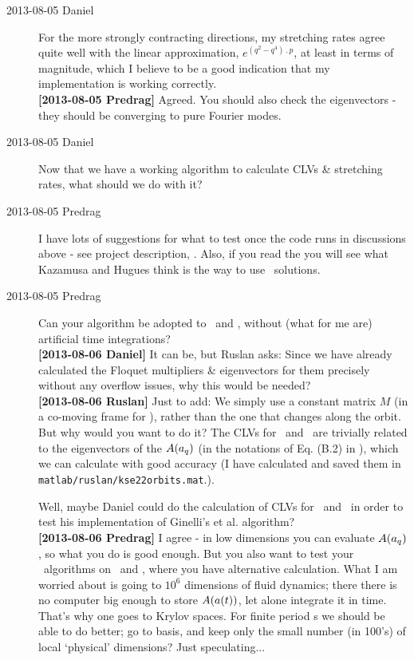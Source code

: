 \begin{description}
\item[2013-08-05 Daniel]
For the more strongly contracting directions, my stretching rates agree
quite well with the linear approximation, $e^{(q^2-q^4)\period{p}}$, at least
in terms of magnitude, which I believe to be a good indication that my
implementation is working correctly.
\\
{\bf [2013-08-05 Predrag]} Agreed. You should also check the eigenvectors - they
should be converging to pure Fourier modes.

\item[2013-08-05 Daniel]
Now that we have a working algorithm to calculate CLVs \& stretching
rates, what should we do with it?

\item[2013-08-05 Predrag] I have lots of suggestions for what to test
once the code runs in discussions above - see project description,
. Also, if you read the  you will
see what Kazamusa and Hugues think is the way to use \po\ solutions.

\item[2013-08-05 Predrag] Can your algorithm be adopted to
\eqva\ and \reqva, without (what for me are) artificial time integrations?
\\
{\bf [2013-08-06 Daniel]} It can be, but Ruslan asks: Since we have
already calculated the Floquet multipliers \& eigenvectors for them
precisely without any overflow issues, why this would be needed?
\\
{\bf [2013-08-06 Ruslan]} Just to add: We simply use a constant matrix
$M$ (in a co-moving frame for \reqva), rather than the one that changes
along the orbit.  But why would you want to do it?  The CLVs for \eqva\
and \reqva\ are trivially related to the eigenvectors of the {\stabmat}
$A(a_q)$ (in the notations of Eq. (B.2) in \refref{SCD07}), which
we can calculate with good accuracy (I have calculated and saved them
in\\ \texttt{matlab/ruslan/kse22orbits.mat}.).

Well, maybe Daniel
could do the calculation of CLVs for \eqva\ and \reqva\ in order to test
his implementation of Ginelli's et al. algorithm?
\\
{\bf [2013-08-06 Predrag]} I agree - in low dimensions you can evaluate
{\stabmat} $A(a_q)$, so what you do is good enough. But you also want to
test your \po\ algorithms on \eqva\ and \reqva, where you have alternative
calculation. What I am worried about is going to $10^6$ dimensions of
fluid dynamics; there there is no computer big enough to store
$A(a(t))$, let alone integrate it in time. That's why one goes to
Krylov spaces. For finite period \po s we should be able to do better; go to
{\cLvs} basis, and keep only the small number (in 100's) of
local `physical' dimensions? Just speculating...


\end{description}
